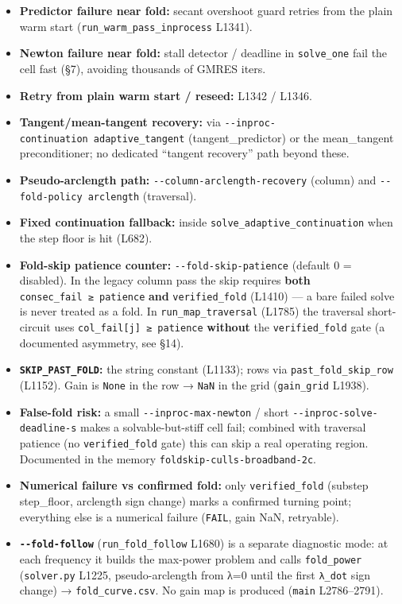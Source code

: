 \documentclass[
  10pt,
]{article}
\providecommand{\tightlist}{%
  \setlength{\itemsep}{0pt}\setlength{\parskip}{0pt}}
\begin{document}
\begin{itemize}
\tightlist
\item
  \textbf{Predictor failure near fold:} secant overshoot guard retries
  from the plain warm start (\texttt{run\_warm\_pass\_inprocess} L1341).
\item
  \textbf{Newton failure near fold:} stall detector / deadline in
  \texttt{solve\_one} fail the cell fast (§7), avoiding thousands of
  GMRES iters.
\item
  \textbf{Retry from plain warm start / reseed:} L1342 / L1346.
\item
  \textbf{Tangent/mean-tangent recovery:} via
  \texttt{-\/-inproc-continuation\ adaptive\_tangent}
  (tangent\_predictor) or the mean\_tangent preconditioner; no dedicated
  ``tangent recovery'' path beyond these.
\item
  \textbf{Pseudo-arclength path:} \texttt{-\/-column-arclength-recovery}
  (column) and \texttt{-\/-fold-policy\ arclength} (traversal).
\item
  \textbf{Fixed continuation fallback:} inside
  \texttt{solve\_adaptive\_continuation} when the step floor is hit
  (L682).
\item
  \textbf{Fold-skip patience counter:} \texttt{-\/-fold-skip-patience}
  (default 0 = disabled). In the legacy column pass the skip requires
  \textbf{both} \texttt{consec\_fail\ ≥\ patience} \textbf{and}
  \texttt{verified\_fold} (L1410) --- a bare failed solve is never
  treated as a fold. In \texttt{run\_map\_traversal} (L1785) the
  traversal short-circuit uses \texttt{col\_fail{[}j{]}\ ≥\ patience}
  \textbf{without} the \texttt{verified\_fold} gate (a documented
  asymmetry, see §14).
\item
  \textbf{\texttt{SKIP\_PAST\_FOLD}:} the string constant (L1133); rows
  via \texttt{past\_fold\_skip\_row} (L1152). Gain is \texttt{None} in
  the row → \texttt{NaN} in the grid (\texttt{gain\_grid} L1938).
\item
  \textbf{False-fold risk:} a small \texttt{-\/-inproc-max-newton} /
  short \texttt{-\/-inproc-solve-deadline-s} makes a solvable-but-stiff
  cell fail; combined with traversal patience (no
  \texttt{verified\_fold} gate) this can skip a real operating region.
  Documented in the memory \texttt{foldskip-culls-broadband-2c}.
\item
  \textbf{Numerical failure vs confirmed fold:} only
  \texttt{verified\_fold} (substep step\_floor, arclength sign change)
  marks a confirmed turning point; everything else is a numerical
  failure (\texttt{FAIL}, gain NaN, retryable).
\item
  \textbf{\texttt{-\/-fold-follow}} (\texttt{run\_fold\_follow} L1680)
  is a separate diagnostic mode: at each frequency it builds the
  max-power problem and calls \texttt{fold\_power} (\texttt{solver.py}
  L1225, pseudo-arclength from λ=0 until the first \texttt{λ\_dot} sign
  change) → \texttt{fold\_curve.csv}. No gain map is produced
  (\texttt{main} L2786--2791).
\end{itemize}
\end{document}

